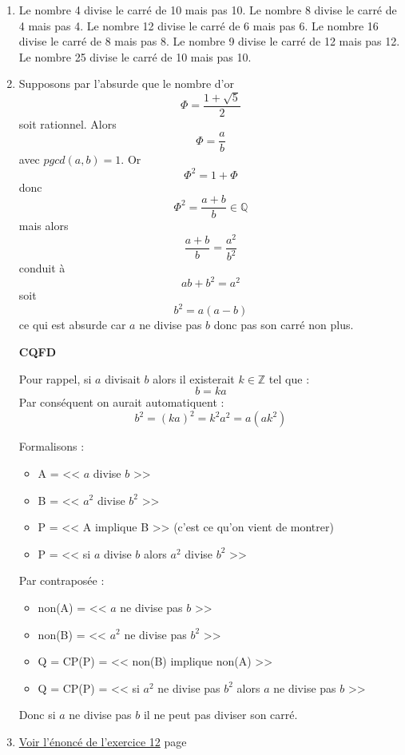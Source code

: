 \documentclass[a4paper,11pt]{book}
\begin{document}
\begin{enumerate}
\item Le nombre 4 divise le carré de 10 mais pas 10. Le nombre 8 divise
le carré de 4 mais pas 4. Le nombre 12 divise le carré de 6 mais
pas 6. Le nombre 16 divise le carré de 8 mais pas 8. Le nombre 9
divise le carré de 12 mais pas 12. Le nombre 25 divise le carré de
10 mais pas 10.
\item Supposons par l'absurde que le nombre d'or
\[\Phi = \dfrac{1 + \sqrt{5}}{2}\] soit rationnel.
Alors
\[\Phi = \dfrac{a}{b}\] avec \(pgcd(a, b) = 1\).
Or
\[\Phi^2 = 1 + \Phi\]
donc
\[\Phi^2 = \dfrac{a + b}{b}\in\mathbb{Q}\]
mais alors
\[\dfrac{a + b}{b} = \dfrac{a^2}{b^2}\]
conduit à
\[ab + b^2 = a^2\]
soit
\[b^2 = a(a - b)\]
ce qui est absurde car \(a\) ne divise pas \(b\) donc pas son carré
non plus.

\textbf{CQFD}

Pour rappel, si \(a\) divisait \(b\) alors il existerait
\(k\in\mathbb{Z}\) tel que :
\[b = ka\]
Par conséquent on aurait automatiquent :
\[b^2 = (ka)^2 = k^2a^2 = a(ak^2)\]

Formalisons :
\begin{itemize}
\item A = << \(a\) divise \(b\) >>
\item B = << \(a^2\) divise \(b^2\) >>
\item P = << A implique B >> (c'est ce qu'on vient de montrer)
\item P = << si \(a\) divise \(b\) alors \(a^2\) divise \(b^2\) >>
\end{itemize}

Par contraposée :
\begin{itemize}
\item non(A) = << \(a\) ne divise pas \(b\) >>
\item non(B) = << \(a^2\) ne divise pas \(b^2\) >>
\item Q = CP(P) = << non(B) implique non(A) >>
\item Q = CP(P) = << si \(a^2\) ne divise pas \(b^2\) alors \(a\) ne
divise pas \(b\) >>
\end{itemize}

Donc si \(a\) ne divise pas \(b\) il ne peut pas diviser son carré.

\item \hyperref[org677ae69]{Voir l'énoncé de l'exercice 12}
page~\pageref{page:sec2.6.7exo12}
\end{enumerate}


\clearpage
\end{document}
